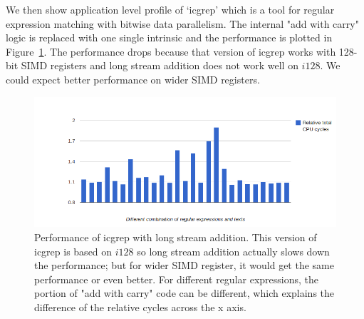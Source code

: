 We then show application level profile of `icgrep' which is a tool for regular expression matching with bitwise data parallelism. The internal "add with carry" logic is replaced with one single intrinsic and the performance is plotted in Figure~\ref{figure:lsadd_icgrep}. The performance drops because that version of icgrep works with 128-bit SIMD registers and long stream addition does not work well on $i128$. We could expect better performance on wider SIMD registers.

\begin{figure}[ht!]
\centering
\includegraphics[width=140mm]{draw/lsadd_icgrep.png}
\caption[Performance of icgrep with long stream addition]{Performance of icgrep with long stream addition. This version of icgrep is based on $i128$ so long stream addition actually slows down the performance; but for wider SIMD register, it would get the same performance or even better. For different regular expressions, the portion of "add with carry" code can be different, which explains the difference of the relative cycles across the x axis.}
\label{figure:lsadd_icgrep}
\end{figure}
